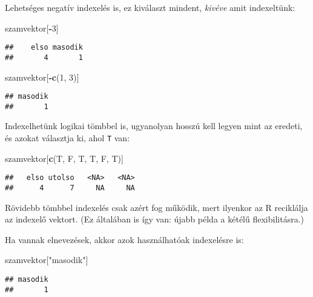 \documentclass[]{book}
\newenvironment{Shaded}{\begin{snugshade}}{\end{snugshade}}
\newcommand{\KeywordTok}[1]{\textcolor[rgb]{0.13,0.29,0.53}{\textbf{#1}}}
\newcommand{\DecValTok}[1]{\textcolor[rgb]{0.00,0.00,0.81}{#1}}
\newcommand{\StringTok}[1]{\textcolor[rgb]{0.31,0.60,0.02}{#1}}
\newcommand{\OperatorTok}[1]{\textcolor[rgb]{0.81,0.36,0.00}{\textbf{#1}}}
\newcommand{\NormalTok}[1]{#1}
\begin{document}
Lehetséges negatív indexelés is, ez kiválaszt mindent, \emph{kivéve}
amit indexeltünk:

\begin{Shaded}
\begin{Highlighting}[]
\NormalTok{szamvektor[}\OperatorTok{-}\DecValTok{3}\NormalTok{]}
\end{Highlighting}
\end{Shaded}

\begin{verbatim}
##    elso masodik 
##       4       1
\end{verbatim}

\begin{Shaded}
\begin{Highlighting}[]
\NormalTok{szamvektor[}\OperatorTok{-}\KeywordTok{c}\NormalTok{(}\DecValTok{1}\NormalTok{, }\DecValTok{3}\NormalTok{)]}
\end{Highlighting}
\end{Shaded}

\begin{verbatim}
## masodik 
##       1
\end{verbatim}

Indexelhetünk logikai tömbbel is, ugyanolyan hosszú kell legyen mint az
eredeti, és azokat választja ki, ahol \texttt{T} van:

\begin{Shaded}
\begin{Highlighting}[]
\NormalTok{szamvektor[}\KeywordTok{c}\NormalTok{(T, F, T, T, F, T)]}
\end{Highlighting}
\end{Shaded}

\begin{verbatim}
##   elso utolso   <NA>   <NA> 
##      4      7     NA     NA
\end{verbatim}

Rövidebb tömbbel indexelés csak azért fog működik, mert ilyenkor az R
reciklálja az indexelő vektort. (Ez általában is így van: újabb példa a
kétélű flexibilitásra.)

Ha vannak elnevezések, akkor azok használhatóak indexelésre is:

\begin{Shaded}
\begin{Highlighting}[]
\NormalTok{szamvektor[}\StringTok{"masodik"}\NormalTok{]}
\end{Highlighting}
\end{Shaded}

\begin{verbatim}
## masodik 
##       1
\end{verbatim}
\end{document}
